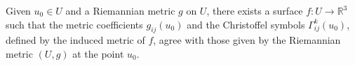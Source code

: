 Given $u_0 \in U$ and a Riemannian metric $g$ on $U$, there exists a surface $f: U \to \mathbb{R}^3$ such that the metric coefficients $g_{ij}(u_0)$ and the Christoffel symbols $\Gamma_{ij}^k(u_0)$, defined by the induced metric of $f$, agree with those given by the Riemannian metric $(U, g)$ at the point $u_0$.
